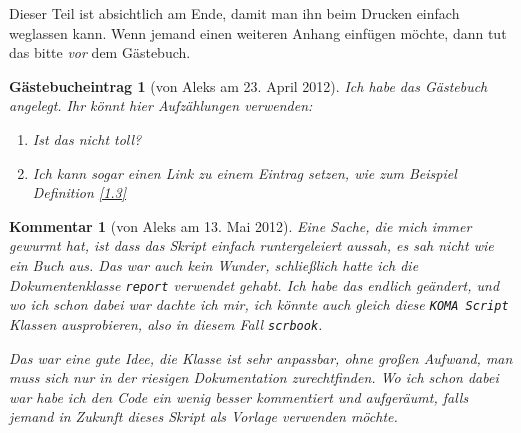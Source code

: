 \documentclass[paper = A4, fontsize=12pt, numbers=noendperiod, chapterprefix=true]{scrbook}
\theoremstyle{break}
\theoremstyle{nonumberbreak}
\newtheorem{gast}{G\"astebucheintrag}
\newtheorem{komm}{Kommentar}
\theoremstyle{nonumberplain}
\begin{document}
Dieser Teil ist absichtlich am Ende, damit man ihn beim Drucken einfach weglassen kann. Wenn jemand einen weiteren Anhang einf\"ugen m\"ochte, dann tut das bitte \emph{vor} dem G\"astebuch.\\

\begin{gast}[von Aleks am 23. April 2012]
Ich habe das G\"astebuch angelegt. Ihr k\"onnt hier Aufz\"ahlungen verwenden:
\begin{enumerate}[1)]
\item
  Ist das nicht toll?
\item
  Ich kann sogar einen Link zu einem Eintrag setzen, wie zum Beispiel Definition \ref{1.3}
\end{enumerate}
\end{gast}

\begin{komm}[von Aleks am 13. Mai 2012]
Eine Sache, die mich immer gewurmt hat, ist dass das Skript einfach runtergeleiert aussah, es sah nicht wie ein Buch aus. Das war auch kein Wunder, schlie\ss lich hatte ich die Dokumentenklasse \verb!report! verwendet gehabt. Ich habe das endlich ge\"andert, und wo ich schon dabei war dachte ich mir, ich k\"onnte auch gleich diese \verb!KOMA Script! Klassen ausprobieren, also in diesem Fall \verb!scrbook!.

Das war eine gute Idee, die Klasse ist sehr anpassbar, ohne gro\ss en Aufwand, man muss sich nur in der riesigen Dokumentation zurechtfinden. Wo ich schon dabei war habe ich den Code ein wenig besser kommentiert und aufger\"aumt, falls jemand in Zukunft dieses Skript als Vorlage verwenden m\"ochte.
\end{komm}
\end{document}

